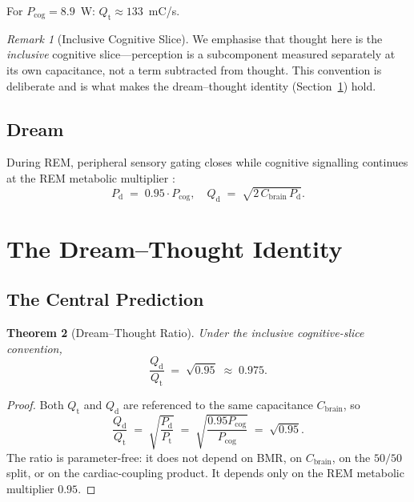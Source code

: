 \documentclass[11pt,twocolumn,a4paper]{article}
\newtheorem{theorem}{Theorem}[section]
\theoremstyle{definition}
\theoremstyle{remark}
\newtheorem{remark}[theorem]{Remark}
\newcommand{\Qt}{Q_{\mathrm{t}}}
\newcommand{\Qd}{Q_{\mathrm{d}}}
\newcommand{\Pt}{P_{\mathrm{t}}}
\newcommand{\Pd}{P_{\mathrm{d}}}
\newcommand{\Pcog}{P_{\mathrm{cog}}}
\newcommand{\Cbrain}{C_{\mathrm{brain}}}
\begin{document}
For $\Pcog = 8.9$~W: $\Qt \approx 133$~mC/s.

\begin{remark}[Inclusive Cognitive Slice]
We emphasise that thought here is the \emph{inclusive} cognitive
slice---perception is a subcomponent measured separately at its own
capacitance, not a term subtracted from thought. This convention is
deliberate and is what makes the dream--thought identity
(Section~\ref{sec:dream-thought}) hold.
\end{remark}

\subsection{Dream}

During REM, peripheral sensory gating closes \citep{llinas1993,
rechtschaffen1968} while cognitive signalling continues at the REM
metabolic multiplier \citep{maquet1990, madsen1991, braun1997}:
\begin{equation}
\Pd \;=\; 0.95 \cdot \Pcog,
\quad
\Qd \;=\; \sqrt{2 \, \Cbrain \, \Pd}.
\end{equation}

\section{The Dream--Thought Identity}
\label{sec:dream-thought}

\subsection{The Central Prediction}

\begin{theorem}[Dream--Thought Ratio]
\label{thm:dream-thought}
Under the inclusive cognitive-slice convention,
\begin{equation}
\boxed{\;\;\frac{\Qd}{\Qt} \;=\; \sqrt{0.95} \;\approx\; 0.975.\;\;}
\label{eq:dream-thought}
\end{equation}
\end{theorem}

\begin{proof}
Both $\Qt$ and $\Qd$ are referenced to the same capacitance
$\Cbrain$, so
\begin{equation}
\frac{\Qd}{\Qt} \;=\; \sqrt{\frac{\Pd}{\Pt}}
\;=\; \sqrt{\frac{0.95 \Pcog}{\Pcog}}
\;=\; \sqrt{0.95}.
\end{equation}
The ratio is parameter-free: it does not depend on BMR, on
$\Cbrain$, on the $50/50$ split, or on the cardiac-coupling
product. It depends only on the REM metabolic multiplier
$0.95$.
\end{proof}
\end{document}
